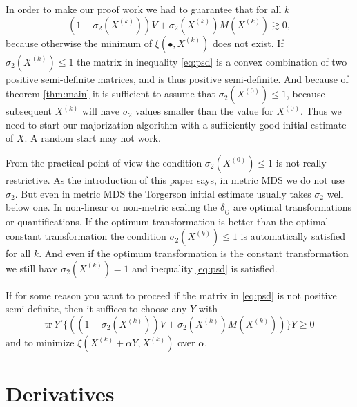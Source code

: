 \documentclass[
  12pt,
]{article}
\theoremstyle{definition}
\theoremstyle{definition}
\theoremstyle{definition}
\theoremstyle{definition}
\theoremstyle{remark}
\begin{document}
In order to make our proof work we had to guarantee that for all \(k\)
\begin{equation}
(1-\sigma_2(X^{(k)}))V+\sigma_2(X^{(k)})M(X^{(k)})\gtrsim 0,
\label{eq:psd}
\end{equation}
because otherwise the minimum of \(\xi(\bullet,X^{(k)})\) does not exist. If \(\sigma_2(X^{(k)})\leq 1\) the matrix in inequality \eqref{eq:psd} is a convex combination of two positive semi-definite matrices, and is thus
positive semi-definite. And because of theorem \ref{thm:main} it is sufficient to assume that
\(\sigma_2(X^{(0)})\leq 1\), because subsequent \(X^{(k)}\) will have \(\sigma_2\) values
smaller than the value for \(X^{(0)}\). Thus we need to start our majorization algorithm with
a sufficiently good initial estimate of \(X\). A random start may not work.

From the practical point of view the condition \(\sigma_2(X^{(0)})\leq 1\) is not
really restrictive. As the introduction of this paper says, in metric MDS we do not
use \(\sigma_2\). But even in metric MDS the Torgerson initial estimate usually
takes \(\sigma_2\) well below one. In non-linear or non-metric scaling the \(\delta_{ij}\) are optimal transformations or quantifications. If the optimum transformation is better
than the optimal constant transformation the condition \(\sigma_2(X^{(k)})\leq 1\)
is automatically satisfied for all \(k\). And even if the optimum transformation is
the constant transformation we still have \(\sigma_2(X^{(k)})=1\) and
inequality \eqref{eq:psd} is satisfied.

If for some reason you want to proceed if the matrix in \eqref{eq:psd} is
not positive semi-definite, then it suffices to choose any \(Y\) with
\begin{equation}
\text{tr}\ Y'\{((1-\sigma_2(X^{(k)}))V+\sigma_2(X^{(k)})M(X^{(k)}))\}Y\geq 0
\label{eq:emergency}
\end{equation}
and to minimize \(\xi(X^{(k)}+\alpha Y,X^{(k)})\) over \(\alpha\).

\section{Derivatives}\label{derivatives}
\end{document}
